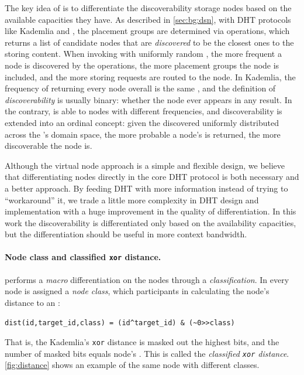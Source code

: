 The key idea of \dht is to differentiate the discoverability storage nodes based on the available capacities they have.
As described in \autoref{sec:bg:dsn}, with DHT protocols like Kademlia and \dht, the placement groups are determined via \ffind operations, which returns a list of candidate nodes that are \emph{discovered} to be the closest ones to the storing content.
When invoking \ffind with uniformly random \vid, the more frequent a node is discovered by the \ffind operations, the more placement groups the node is included, and the more storing requests are routed to the node.
In Kademlia, the frequency of \ffind returning every node overall \ffind is the same , and the definition of \emph{discoverability} is usually binary: whether the node ever appears in any \ffind result.
In the contrary, \dht is able to \ffind nodes with different frequencies, and discoverability is extended into an ordinal concept: given the discovered \vid uniformly distributed across the \vid{}'s domain space, the more probable a node's \vid is returned, the more discoverable the node is.

Although the virtual node approach is a simple and flexible design, we believe that differentiating nodes directly in the core DHT protocol is both necessary and a better approach.
By feeding DHT with more information instead of trying to ``workaround'' it, we trade a little more complexity in DHT design and implementation with a huge improvement in the quality of differentiation.
In this work the discoverability is differentiated only based on the availability capacities, but the differentiation should be useful in more context \eg bandwidth.


\paragraph{Node class and classified {\normalfont \texttt{xor}} distance.}
\dht performs a \emph{macro} differentiation on the nodes through a \emph{classification}.
In \dht every node is assigned a \emph{node class}, which participants in calculating the node's distance to an \vid:
\begin{verbatim}
dist(id,target_id,class) = (id^target_id) & (~0>>class)
\end{verbatim}
That is, the Kademlia's \texttt{xor} distance is masked out the highest bits, and the number of masked bits equals node's \vclass.
This is called the \emph{classified {\normalfont \texttt{xor}} distance}.
\autoref{fig:distance} shows an example of the same node with different classes.

